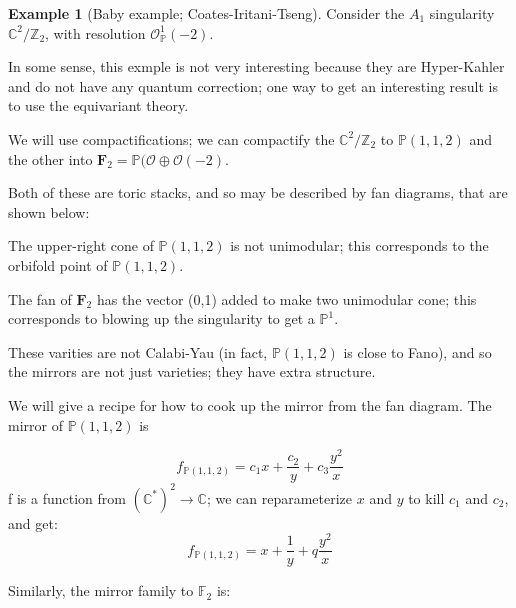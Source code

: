 \documentclass{amsart}
\theoremstyle{definition}
\newtheorem{example}[dummy]{Example}
\newcommand{\Z}{\mathbb{Z}}
\newcommand{\OO}{\mathcal{O}}
\newcommand{\proj}{\mathbb{P}}
\newcommand{\C}{\mathbb{C}}
\begin{document}
\begin{example}[Baby example; Coates-Iritani-Tseng]
Consider the $A_1$ singularity $\C^2/\Z_2$, with resolution $\OO_\proj^1(-2)$.

In some sense, this exmple is not very interesting because they are Hyper-Kahler and do not have any quantum correction; one way to get an interesting result is to use the equivariant theory.

We will use compactifications; we can compactify the $\C^2/\Z_2$ to $\proj(1,1,2)$ and the other into $\mathbf{F}_2=\proj(\OO\oplus\OO(-2)$.

Both of these are toric stacks, and so may be described by fan diagrams, that are shown below:

\begin{center}
\end{center}
The upper-right cone of $\proj(1,1,2)$ is not unimodular; this corresponds to the orbifold point of $\proj(1,1,2)$. 

The fan of $\mathbf{F}_2$ has the vector (0,1) added to make two unimodular cone; this corresponds to blowing up the singularity to get a $\proj^1$.


These varities are not Calabi-Yau (in fact, $\proj(1,1,2)$ is close to Fano), and so the mirrors are not just varieties; they have extra structure.

  We will give a recipe for how to cook up the mirror from the fan diagram.
The mirror of $\proj(1,1,2)$ is

$$f_{\proj(1,1,2)}=c_1x+\frac{c_2}{y}+c_3\frac{y^2}{x}$$
f is a function from $(\C^*)^2\to\C$; we can reparameterize $x$ and $y$ to kill $c_1$ and $c_2$, and get:
$$f_{\proj(1,1,2)}=x+\frac{1}{y}+q\frac{y^2}{x}$$

Similarly, the mirror family to $\mathbb{F}_2$ is:


\end{example}
\end{document}
